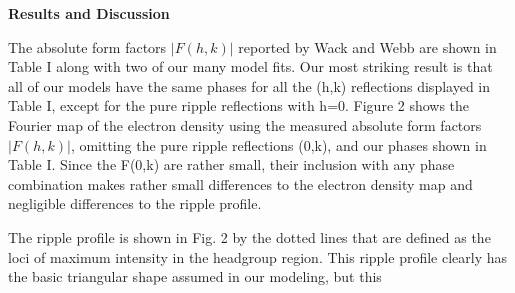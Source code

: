 
\vspace{0.128in}
\noindent
{\bf Results and Discussion}
\vspace{0.128in}

The absolute form factors $|F(h,k)|$ reported by Wack and Webb \cite{Wac89a} 
are shown in Table I along with two of our many model fits.
Our most striking result is that all of our models have the same
phases for all the (h,k) reflections displayed in Table I,
except for the pure ripple
reflections with h=0.  Figure 2 shows the Fourier map
of the electron density using the measured \cite{Wac89a} absolute form factors
$|F(h,k)|$, omitting the pure ripple reflections (0,k),
and our phases shown in Table I.
Since the F(0,k) are rather small, their inclusion with any phase
combination makes rather small differences to the electron
density map and negligible differences to the ripple profile.

The ripple profile is shown in Fig. 2 by the dotted lines
that are defined as the loci of maximum intensity in the headgroup
region.  This ripple profile clearly has the 
basic triangular shape
assumed in our modeling, but this

